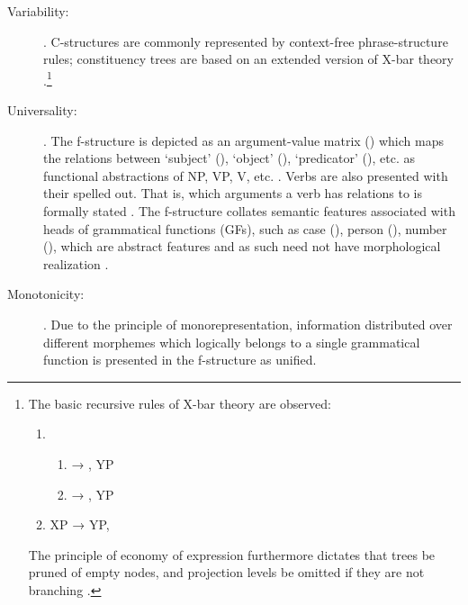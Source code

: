 \begin{description}
\item[Variability:] . 
C-structures are commonly represented by context-free phrase-structure rules; 
constituency trees are based on an extended version of X-bar theory 
\citep[42]{bresnan2016}.\footnote{The basic recursive rules of X-bar theory 
are observed:
\begin{enumerate}[nosep, leftmargin={2\footnotemargin}]
\item \begin{enumerate}
	\item {} → , YP
	\item {} → , YP
\end{enumerate}\medskip
\item XP → YP, 
\end{enumerate}

The principle of economy of expression furthermore dictates that trees be 
pruned of empty nodes, and projection levels be omitted if they are not 
branching \citep[119--128]{bresnan2016}.}

\item[Universality:] . The f-structure is depicted 
as an argument-value matrix (\Avm{}) which maps the relations between 
`subject' (\Sbj{}), `object' (\Obj{}), `predicator' (\Pred{}), etc. as 
functional abstractions of NP, VP, V, etc. \citep[42]{bresnan2016}. Verbs 
are also presented with their  spelled out. That is, which 
arguments a verb has relations to is formally stated \citep[15]{bresnan2016}. 
The f-structure collates semantic features associated with heads of grammatical 
functions (GFs), such as case (\Case{}), person (\Pers{}), number (\Num{}), 
which are abstract features and as such need not have morphological realization 
\citep[43]{bresnan2016}.

\item[Monotonicity:] . Due to the principle of monorepresentation, 
information distributed over different morphemes which logically 
belongs to a single grammatical function is presented in the f-structure as 
unified.

\end{description}

